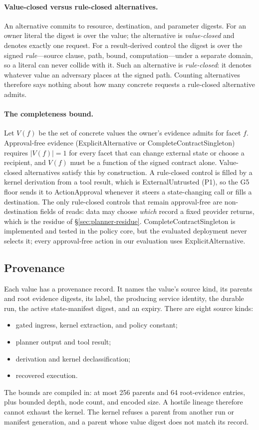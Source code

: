 \documentclass[letterpaper,twocolumn,10pt]{article}
\begin{document}
\paragraph{Value-closed versus rule-closed alternatives.} An alternative
commits to resource, destination, and parameter digests. For an owner
literal the digest is over the value; the alternative is \emph{value-closed}
and denotes exactly one request. For a result-derived control the digest is
over the signed \emph{rule}---source clause, path, bound, computation---under
a separate domain, so a literal can never collide with it. Such an
alternative is \emph{rule-closed}: it denotes whatever value an adversary
places at the signed path. Counting alternatives therefore says nothing
about how many concrete requests a rule-closed alternative admits.

\paragraph{The completeness bound.} Let $V(f)$ be the set of concrete
values the owner's evidence admits for facet $f$. Approval-free evidence
(\textsf{ExplicitAlternative} or \textsf{CompleteContractSingleton})
requires $|V(f)|=1$ for every facet that can change external state or
choose a recipient, and $V(f)$ must be a function of the signed contract
alone. Value-closed alternatives satisfy this by construction. A
rule-closed control is filled by a kernel derivation from a tool result,
which is \textsf{ExternalUntrusted} (P1), so the G5 floor sends it to
\textsf{ActionApproval} whenever it steers a state-changing call or fills a
destination. The only rule-closed controls that remain approval-free are
non-destination fields of reads: data may choose \emph{which} record a
fixed provider returns, which is the residue of \S\ref{sec:planner-residue}.
\textsf{CompleteContractSingleton} is implemented and tested in the policy
core, but the evaluated deployment never selects it; every approval-free
action in our evaluation uses \textsf{ExplicitAlternative}.

\subsection{Provenance}

Each value has a provenance record. It names the value's source kind, its
parents and root evidence digests, its label, the producing service
identity, the durable run, the active state-manifest digest, and an expiry.
There are eight source kinds:
\begin{itemize}
\item gated ingress, kernel extraction, and policy constant;
\item planner output and tool result;
\item derivation and kernel declassification;
\item recovered execution.
\end{itemize}
The bounds are compiled in: at most 256 parents and 64 root-evidence
entries, plus bounded depth, node count, and encoded size. A hostile
lineage therefore cannot exhaust the kernel. The kernel refuses a parent
from another run or manifest generation, and a parent whose value digest
does not match its record.
\end{document}

